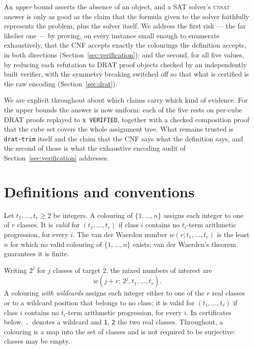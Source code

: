\documentclass[12pt]{article}
\theoremstyle{remark}
\begin{document}
An \emph{upper} bound asserts the absence of an object, and a SAT solver's
\textsc{unsat} answer is only as good as the claim that the formula given to
the solver faithfully represents the problem, plus the solver itself. We
address the first risk --- the far likelier one --- by proving, on every
instance small enough to enumerate exhaustively, that the CNF accepts exactly
the colourings the definition accepts, in both directions
(Section~\ref{sec:verification}); and the second, for all five values, by reducing
each refutation to DRAT proof objects checked by an independently built
verifier, with the symmetry breaking switched off so that what is certified
is the raw encoding (Section~\ref{sec:drat}).

We are explicit throughout about which claims carry which kind of evidence.
For the upper bounds the answer is now uniform: each of the five rests on
per-cube DRAT proofs replayed to \texttt{s VERIFIED}, together with a checked
composition proof that the cube set covers the whole assignment tree. What
remains trusted is \texttt{drat-trim} itself and the claim that the CNF says
what the definition says, and the second of those is what the exhaustive
encoding audit of Section~\ref{sec:verification} addresses.

\section{Definitions and conventions}\label{sec:defs}

Let $t_1,\dots,t_r \ge 2$ be integers. A colouring of $\{1,\dots,n\}$
assigns each integer to one of $r$ classes. It is \emph{valid} for
$(t_1,\dots,t_r)$ if class $i$ contains no $t_i$-term arithmetic progression,
for every $i$. The van der Waerden number $w(r;t_1,\dots,t_r)$ is the least
$n$ for which no valid colouring of $\{1,\dots,n\}$ exists; van der Waerden's
theorem guarantees it is finite.

Writing $2^j$ for $j$ classes of target $2$, the mixed numbers of interest
are
\[
  w(j+r;\,2^j,t_1,\dots,t_r).
\]
A colouring \emph{with wildcards} assigns each integer either to one of the
$r$ real classes or to a wildcard position that belongs to no class; it is
valid for $(t_1,\dots,t_r)$ if class $i$ contains no $t_i$-term arithmetic
progression, for every $i$. In certificates below, \texttt{.}\ denotes a
wildcard and \texttt{1}, \texttt{2} the two real classes. Throughout, a
colouring is a map into the set of classes and is not required to be
surjective: classes may be empty.
\end{document}
